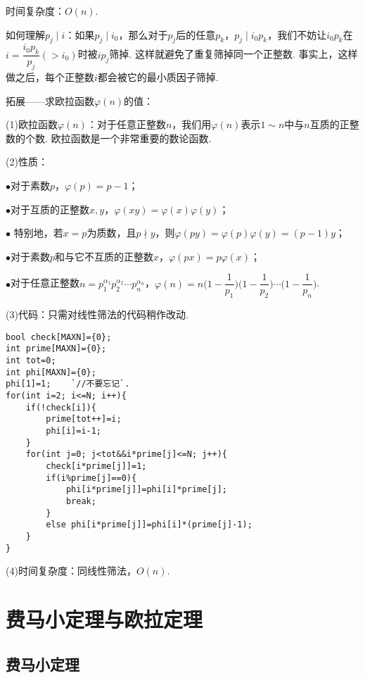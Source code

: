 \documentclass[a4paper]{article}
\newcommand{\hei}{\CJKfamily{hei}}
\def\dou{，\!\!}
\begin{document}
    {\hei 时间复杂度：\!\!}$O(n)$.

    {\hei 如何理解$p_j\mid i$：\!\!}如果$p_j\mid i_0$\dou 那么对于$p_j$后的任意$p_k$\dou $p_j\mid i_0p_k$\dou 我们不妨让$i_0p_k$在$i=\dfrac{i_0p_k}{p_j}(>i_0)$时被$ip_j$筛掉. 这样就避免了重复筛掉同一个正整数. 事实上\dou 这样做之后\dou 每个正整数$i$都会被它的最小质因子筛掉.

    {\hei 拓展——求欧拉函数$\varphi(n)$的值：\!\!}

    (1)欧拉函数$\varphi(n)$：\!\!对于任意正整数$n$\dou 我们用$\varphi(n)$表示$1\sim n$中与$n$互质的正整数的个数. 欧拉函数是一个非常重要的数论函数.

    (2)性质：\!\!

    $\bullet$对于素数$p$\dou $\varphi(p)=p-1$；\!\!

    $\bullet$对于互质的正整数$x,y$\dou $\varphi(xy)=\varphi(x)\varphi(y)$；\!\!

    {\color{white}$\bullet$} 特别地\dou 若$x=p$为质数\dou 且$p\nmid y$\dou 则$\varphi(py)=\varphi(p)\varphi(y)=(p-1)y$；\!\!

    $\bullet$对于素数$p$和与它不互质的正整数$x$\dou $\varphi(px)=p\varphi(x)$；\!\!

    $\bullet$对于任意正整数$n=p_1^{\alpha_1}p_2^{\alpha_2}\cdots p_n^{\alpha_n}$\dou $\varphi(n)=n\bigg(1-\dfrac{1}{p_1}\bigg)\!\bigg(1-\dfrac{1}{p_2}\bigg)\cdots\bigg(1-\dfrac{1}{p_n}\bigg)$.

    (3)代码：\!\!只需对线性筛法的代码稍作改动.

    \begin{lstlisting}
bool check[MAXN]={0};
int prime[MAXN]={0};
int tot=0;
int phi[MAXN]={0};
phi[1]=1;    `//不要忘记`.
for(int i=2; i<=N; i++){
    if(!check[i]){
        prime[tot++]=i;
        phi[i]=i-1;
    }        
    for(int j=0; j<tot&&i*prime[j]<=N; j++){
        check[i*prime[j]]=1;
        if(i%prime[j]==0){
            phi[i*prime[j]]=phi[i]*prime[j];
            break;
        }
        else phi[i*prime[j]]=phi[i]*(prime[j]-1);
    }
}
    \end{lstlisting}

    (4)时间复杂度：\!\!同线性筛法\dou $O(n)$.

    \section{费马小定理与欧拉定理}

    \subsection{费马小定理}
\end{document}
